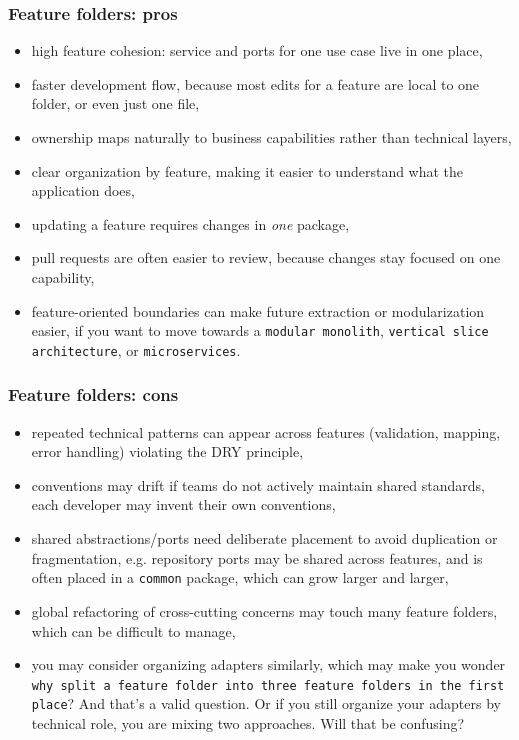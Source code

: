 \subsubsection{Feature folders: pros}

\begin{itemize}
    \item high feature cohesion: service and ports for one use case live in one place,
    \item faster development flow, because most edits for a feature are local to one folder, or even just one file,
    \item ownership maps naturally to business capabilities rather than technical layers,
    \item clear organization by feature, making it easier to understand what the application does,
    \item updating a feature requires changes in \textit{one} package,
    \item pull requests are often easier to review, because changes stay focused on one capability,
    \item feature-oriented boundaries can make future extraction or modularization easier, if you want to move towards a \texttt{modular monolith}, \texttt{vertical slice architecture}, or \texttt{microservices}. 
\end{itemize}

\subsubsection{Feature folders: cons}

\begin{itemize}
    \item repeated technical patterns can appear across features (validation, mapping, error handling) violating the DRY principle,
    \item conventions may drift if teams do not actively maintain shared standards, each developer may invent their own conventions,
    \item shared abstractions/ports need deliberate placement to avoid duplication or fragmentation, e.g. repository ports may be shared across features, and is often placed in a \texttt{common} package, which can grow larger and larger,
    \item global refactoring of cross-cutting concerns may touch many feature folders, which can be difficult to manage,
    \item you may consider organizing adapters similarly, which may make you wonder \texttt{why split a feature folder into three feature folders in the first place}? And that's a valid question. Or if you still organize your adapters by technical role, you are mixing two approaches. Will that be confusing?
\end{itemize}

